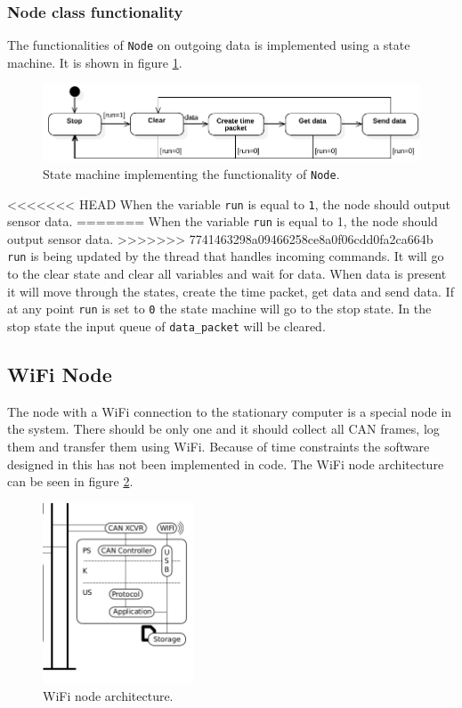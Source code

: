 \subsubsection*{Node class functionality}
The functionalities of \texttt{Node} on outgoing data is implemented using a state machine.
It is shown in figure \ref{fig:state_machine}.
\begin{figure}[!h]
\centering
\includegraphics[width=1\textwidth]{graphics/StateDiagram_Node.pdf}
\caption{State machine implementing the functionality of \texttt{Node}. }
\label{fig:state_machine}
\end{figure}
<<<<<<< HEAD
When the variable \texttt{run} is equal to \texttt{1}, the node should output sensor data.
=======
When the variable \texttt{run} is equal to 1, the node should output sensor data.
>>>>>>> 7741463298a09466258ce8a0f06cdd0fa2ca664b
\texttt{run} is being updated by the thread that handles incoming commands.
It will go to the clear state and clear all variables and wait for data. 
When data is present it will move through the states, create the time packet, get data and send data. 
If at any point \texttt{run} is set to \texttt{0} the state machine will go to the stop state.
In the stop state the input queue of \texttt{data\_packet} will be cleared.


\subsection{WiFi Node}\label{sec:somewifinodesection}
The node with a WiFi connection to the stationary computer is a special node in the system.
There should be only one and it should collect all CAN frames, log them and transfer them using WiFi.
Because of time constraints the software designed in this has not been implemented in code.
The WiFi node architecture can be seen in figure \ref{fig:wifi_node}.

\begin{figure}[!h]
\centering
\includegraphics[width=0.4\textwidth]{graphics/wifi_node}
\caption{WiFi node architecture.}
\label{fig:wifi_node}
\end{figure}

